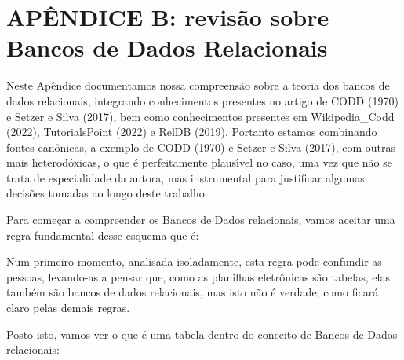 \documentclass[
12pt,		%
openright,	%
twoside,  %
a4paper,			%
chapter=TITLE,		%
english,			%
french,				%
spanish,			%
brazil				%
]{USPSC-classe/USPSC}
\begin{document}
\chapter[AP\^ENDICE B: revis\~ao sobre Bancos de Dados Relacionais]{AP\^ENDICE B: revis\~ao sobre Bancos de Dados Relacionais}\label{AP\^ENDICE B: revis\~ao sobre Bancos de Dados Relacionais}
Neste Ap\^endice documentamos nossa compreens\~ao sobre a teoria dos bancos de dados relacionais, integrando conhecimentos presentes no artigo de  CODD (1970) e  Setzer e Silva (2017), bem como conhecimentos presentes em Wikipedia\_Codd (2022),  TutorialsPoint (2022) e  RelDB (2019). Portanto estamos combinando fontes can\^onicas, a exemplo de  CODD (1970) e Setzer e Silva (2017), com outras mais heterod\'oxicas, o que \'e perfeitamente plaus\'{\i}vel no caso, uma vez que n\~ao se trata de especialidade da autora, mas instrumental para justificar algumas decis\~oes tomadas ao longo deste trabalho.








Para come\c{c}ar a compreender os Bancos de Dados relacionais, vamos aceitar uma regra fundamental desse esquema que \'e:









\noindent\begin{center}\mbox{\centering{}}\end{center}


Num primeiro momento, analisada isoladamente, esta regra pode confundir as pessoas, levando-as a pensar que, como as planilhas eletr\^onicas s\~ao tabelas, elas tamb\'em s\~ao bancos de dados relacionais, mas isto n\~ao \'e verdade, como ficar\'a claro pelas demais regras.








Posto isto, vamos ver o que \'e uma tabela dentro do conceito de Bancos de Dados relacionais:
\end{document}
